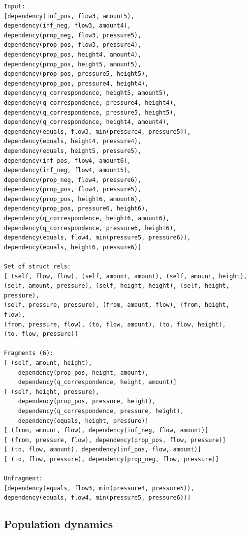 \documentclass{article} %
\begin{document}
\begin{verbatim}
Input:
[dependency(inf_pos, flow3, amount5), 
dependency(inf_neg, flow3, amount4), 
dependency(prop_neg, flow3, pressure5), 
dependency(prop_pos, flow3, pressure4), 
dependency(prop_pos, height4, amount4), 
dependency(prop_pos, height5, amount5), 
dependency(prop_pos, pressure5, height5), 
dependency(prop_pos, pressure4, height4), 
dependency(q_correspondence, height5, amount5), 
dependency(q_correspondence, pressure4, height4), 
dependency(q_correspondence, pressure5, height5), 
dependency(q_correspondence, height4, amount4), 
dependency(equals, flow3, min(pressure4, pressure5)), 
dependency(equals, height4, pressure4), 
dependency(equals, height5, pressure5), 
dependency(inf_pos, flow4, amount6), 
dependency(inf_neg, flow4, amount5), 
dependency(prop_neg, flow4, pressure6), 
dependency(prop_pos, flow4, pressure5), 
dependency(prop_pos, height6, amount6), 
dependency(prop_pos, pressure6, height6), 
dependency(q_correspondence, height6, amount6), 
dependency(q_correspondence, pressure6, height6), 
dependency(equals, flow4, min(pressure5, pressure6)), 
dependency(equals, height6, pressure6)]

Set of struct rels: 
[ (self, flow, flow), (self, amount, amount), (self, amount, height), 
(self, amount, pressure), (self, height, height), (self, height, pressure),
(self, pressure, pressure), (from, amount, flow), (from, height, flow), 
(from, pressure, flow), (to, flow, amount), (to, flow, height), 
(to, flow, pressure)]

Fragments (6):
[ (self, amount, height), 
	dependency(prop_pos, height, amount), 
	dependency(q_correspondence, height, amount)]
[ (self, height, pressure), 
	dependency(prop_pos, pressure, height), 
	dependency(q_correspondence, pressure, height), 
	dependency(equals, height, pressure)]
[ (from, amount, flow), dependency(inf_neg, flow, amount)]
[ (from, pressure, flow), dependency(prop_pos, flow, pressure)]
[ (to, flow, amount), dependency(inf_pos, flow, amount)]
[ (to, flow, pressure), dependency(prop_neg, flow, pressure)]

Unfragment:
[dependency(equals, flow3, min(pressure4, pressure5)), 
dependency(equals, flow4, min(pressure5, pressure6))]
\end{verbatim}


\subsection{Population dynamics}
\end{document}
